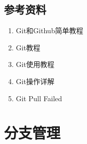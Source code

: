 \documentclass[letterpaper,10pt,english]{sphinxmanual}
\begin{document}
\subsection{参考资料}
\label{\detokenize{git/02_remoteRep:id3}}\begin{enumerate}
\item {} 
Git和Github简单教程

\end{enumerate}
\begin{quote}

\end{quote}
\begin{enumerate}
\setcounter{enumi}{1}
\item {} 
Git教程

\end{enumerate}
\begin{quote}

\end{quote}
\begin{enumerate}
\setcounter{enumi}{2}
\item {} 
Git使用教程

\end{enumerate}
\begin{quote}

\end{quote}
\begin{enumerate}
\setcounter{enumi}{3}
\item {} 
Git操作详解

\end{enumerate}
\begin{quote}

\end{quote}
\begin{enumerate}
\setcounter{enumi}{4}
\item {} 
Git Pull Failed

\end{enumerate}
\begin{quote}

\end{quote}


\section{分支管理}
\label{\detokenize{git/03_branch::doc}}\label{\detokenize{git/03_branch:id1}}
\end{document}
